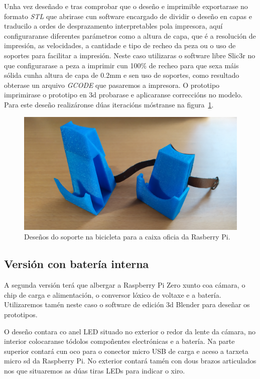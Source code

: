     Unha vez deseñado e tras comprobar que o deseño e imprimible exportarase no formato \emph{STL} que abrirase cun software encargado de dividir o deseño en capas e traducilo a ordes de desprazamento interpretables pola impresora, aquí configuraranse diferentes parámetros como a altura de capa, que é a resolución de impresión, as velocidades, a cantidade e tipo de recheo da peza ou o uso de soportes para facilitar a impresión. Neste caso utilizaras o software libre Slic3r no que configurarase a peza a imprimir cun 100\(\%\) de recheo para que sexa máis sólida cunha altura de capa de 0.2mm e sen uso de soportes, como resultado obterase un arquivo \emph{GCODE}  que pasaremos a impresora. O prototipo imprimirase o prototipo en 3d probarase e aplicaranse correccións no modelo. Para este deseño realizáronse dúas iteracións móstranse na figura~\ref{fig:soporte_caixa}.

    \begin{figure}[tbp]
      \centering
      \includegraphics[scale=.1]{imaxes/soporte-caixa.jpg}
      \caption{Deseños do soporte na bicicleta para a caixa oficia da Rasberry Pi.}
      \label{fig:soporte_caixa}
    \end{figure}


    \subsection{Versión con batería interna}
    A segunda versión terá que albergar a Raspberry Pi Zero xunto coa cámara, o chip de carga e alimentación, o conversor lóxico de voltaxe e a batería. Utilizaremos tamén neste caso o software de edición 3d Blender para deseñar os prototipos.

    O deseño contara co anel LED situado no exterior o redor da lente da cámara, no interior colocaranse tódolos compoñentes electrónicas e a batería. Na parte superior contará cun oco para o conector micro USB de carga e aceso a tarxeta micro sd da Raspberry Pi. No exterior contará tamén con dous brazos articulados nos que situaremos as dúas tiras LEDs para indicar o xiro.

